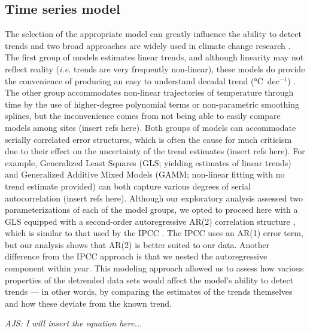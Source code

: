 \documentclass{ametsoc}
\begin{document}
\subsection{Time series model}
The selection of the appropriate model can greatly influence the ability to detect trends \citet{Franzke2012} and two broad approaches are widely used in climate change research \citep{IPCC2013}. The first group of models estimates linear trends, and although linearity may not reflect reality (\emph{i.e.} trends are very frequently non-linear), these models do provide the convenience of producing an easy to understand decadal trend (\si{\degreeCelsius}~dec$^{-1}$) \citep{Wilks2006}. The other group accommodates non-linear trajectories of temperature through time by the use of higher-degree polynomial terms or non-parametric smoothing splines, but the inconvenience comes from not being able to easily compare models among sites (insert refs here). Both groups of models can accommodate serially correlated error structures, which is often the cause for much criticism due to their effect on the uncertainty of the trend estimates (insert refs here). For example, Generalized Least Squares (GLS; yielding estimates of linear trends) and Generalized Additive Mixed Models (GAMM; non-linear fitting with no trend estimate provided) can both capture various degrees of serial autocorrelation (insert refs here). Although our exploratory analysis assessed two parameterizations of each of the model groups, we opted to proceed here with a GLS equipped with a second-order autoregressive AR(2) correlation structure \citep{Wood2006}, which is similar to that used by the IPCC \citep{IPCC2013}. The IPCC uses an AR(1) error term, but our analysis shows that AR(2) is better suited to our data. Another difference from the IPCC approach is that we nested the autoregressive component within year. This modeling approach allowed us to assess how various properties of the detrended data sets would affect the model’s ability to detect trends --- in other words, by comparing the estimates of the trends themselves and how these deviate from the known trend.

\emph{AJS: I will insert the equation here...}
\end{document}
